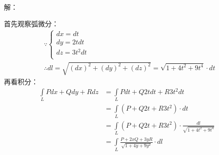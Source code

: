 解：

首先观察弧微分：
\begin{align*}
&\because \begin{cases}
	dx=dt\\
	dy=2tdt\\
	dz=3t^2dt\\
\end{cases} \\
&\therefore dl=\sqrt{\left( dx \right) ^2+\left( dy \right) ^2+\left( dz \right) ^2}=\sqrt{1+4t^2+9t^4}\cdot dt
\end{align*}
再看积分：
\begin{align*}
\int\limits_L{Pdx+Qdy+Rdz}&=\int\limits_L{Pdt+Q2tdt+R3t^2dt} \\
&=\int\limits_L{\left( P+Q2t+R3t^2 \right) \cdot dt} \\
&=\int\limits_L{\left( P+Q2t+R3t^2 \right) \cdot \frac{dl}{\sqrt{1+4t^2+9t^4}}} \\
&=\int\limits_L{\frac{P+2xQ+3yR}{\sqrt{1+4y+9y^2}}\cdot dl}
\end{align*}




